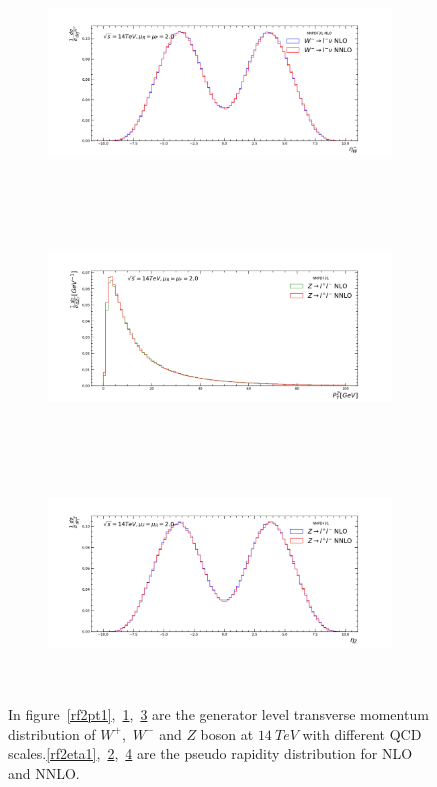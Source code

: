 \begin{figure}[H]
\begin{subfigure}{0.49\textwidth}
\caption{}
\label{rf2pt2}
\end{subfigure}
\begin{subfigure}{0.49\textwidth}
\includegraphics[height=6cm, width=\textwidth]{chapter4/Wwmeta_rf2_14.pdf}
\vspace*{-8mm}
\caption{}
\label{rf2eta2}
\end{subfigure}
\begin{subfigure}{0.49\textwidth}
\includegraphics[height=6cm, width=\textwidth]{chapter4/Zpt_rf2_14.pdf}
\vspace*{-8mm}
\caption{}
\label{rf2pt3}
\end{subfigure}
\begin{subfigure}{0.49\textwidth}
\includegraphics[height=6cm, width=\textwidth]{chapter4/Zeta_rf2_14.pdf}
\vspace*{-8mm}
\caption{}
\label{rf2eta3}
\end{subfigure}
\caption{In figure~\ref{rf2pt1},~\ref{rf2pt2},~\ref{rf2pt3} are the generator level transverse momentum distribution of $W^{+}$,~$W^{-}$ and $Z$ boson at $14~TeV$ with different QCD scales.\ref{rf2eta1},~\ref{rf2eta2},~\ref{rf2eta3} are the pseudo rapidity distribution for NLO and NNLO.}  
\label{dist3}
\end{figure}

